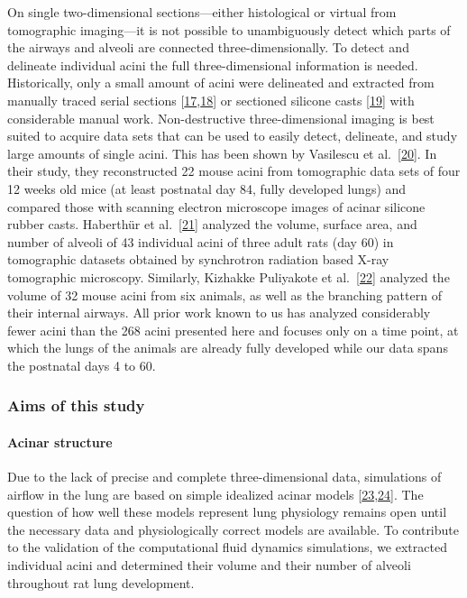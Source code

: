 \documentclass[
  american,
]{article}
\begin{document}
On single two-dimensional sections---either histological or virtual from tomographic imaging---it is not possible to unambiguously detect which parts of the airways and alveoli are connected three-dimensionally.
To detect and delineate individual acini the full three-dimensional information is needed.
Historically, only a small amount of acini were delineated and extracted from manually traced serial sections {[}\protect\hyperlink{ref-c3aIB7f9}{17},\protect\hyperlink{ref-CPhMy3Ie}{18}{]} or sectioned silicone casts {[}\protect\hyperlink{ref-1GJECnKBu}{19}{]} with considerable manual work.
Non-destructive three-dimensional imaging is best suited to acquire data sets that can be used to easily detect, delineate, and study large amounts of single acini.
This has been shown by Vasilescu et al.~{[}\protect\hyperlink{ref-C6OaY84D}{20}{]}.
In their study, they reconstructed 22 mouse acini from tomographic data sets of four 12 weeks old mice (at least postnatal day 84, fully developed lungs) and compared those with scanning electron microscope images of acinar silicone rubber casts.
Haberthür et al.~{[}\protect\hyperlink{ref-7YLeeyu}{21}{]} analyzed the volume, surface area, and number of alveoli of 43 individual acini of three adult rats (day 60) in tomographic datasets obtained by synchrotron radiation based X-ray tomographic microscopy.
Similarly, Kizhakke Puliyakote et al.~{[}\protect\hyperlink{ref-RGBeCf8v}{22}{]} analyzed the volume of 32 mouse acini from six animals, as well as the branching pattern of their internal airways.
All prior work known to us has analyzed considerably fewer acini than the 268 acini presented here and focuses only on a time point, at which the lungs of the animals are already fully developed while our data spans the postnatal days 4 to 60.

\hypertarget{aims-of-this-study}{%
\subsubsection{Aims of this study}\label{aims-of-this-study}}

\hypertarget{acinar-structure}{%
\paragraph{Acinar structure}\label{acinar-structure}}

Due to the lack of precise and complete three-dimensional data, simulations of airflow in the lung are based on simple idealized acinar models {[}\protect\hyperlink{ref-NPtttMC0}{23},\protect\hyperlink{ref-6zXNR8r2}{24}{]}.
The question of how well these models represent lung physiology remains open until the necessary data and physiologically correct models are available.
To contribute to the validation of the computational fluid dynamics simulations, we extracted individual acini and determined their volume and their number of alveoli throughout rat lung development.
\end{document}
